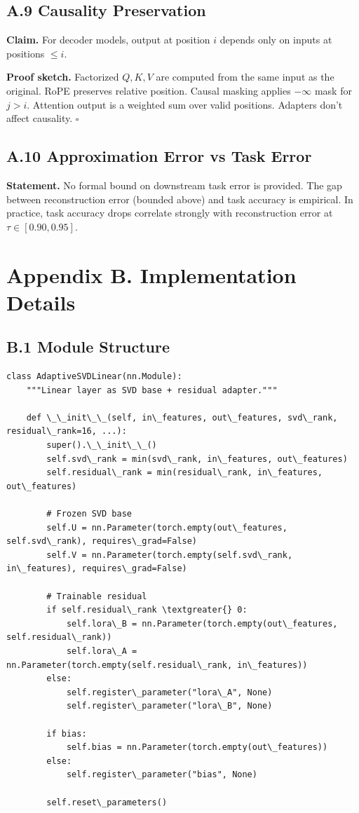 \subsection{A.9 Causality Preservation}

\textbf{Claim.} For decoder models, output at position $i$ depends only on inputs 
at positions $\leq i$.

\textbf{Proof sketch.} Factorized $Q, K, V$ are computed from the same input as 
the original. RoPE preserves relative position. Causal masking applies 
$-\infty$ mask for $j > i$. Attention output is a weighted sum over valid 
positions. Adapters don't affect causality. $\square$

\subsection{A.10 Approximation Error vs Task Error}

\textbf{Statement.} No formal bound on downstream task error is provided. The gap 
between reconstruction error (bounded above) and task accuracy is 
empirical. In practice, task accuracy drops correlate strongly with 
reconstruction error at $\tau \in [0.90, 0.95]$.


\section{Appendix B. Implementation Details}

\subsection{B.1 Module Structure}

\begin{lstlisting}
class AdaptiveSVDLinear(nn.Module):
    """Linear layer as SVD base + residual adapter."""
    
    def \_\_init\_\_(self, in\_features, out\_features, svd\_rank, residual\_rank=16, ...):
        super().\_\_init\_\_()
        self.svd\_rank = min(svd\_rank, in\_features, out\_features)
        self.residual\_rank = min(residual\_rank, in\_features, out\_features)
        
        # Frozen SVD base
        self.U = nn.Parameter(torch.empty(out\_features, self.svd\_rank), requires\_grad=False)
        self.V = nn.Parameter(torch.empty(self.svd\_rank, in\_features), requires\_grad=False)
        
        # Trainable residual
        if self.residual\_rank \textgreater{} 0:
            self.lora\_B = nn.Parameter(torch.empty(out\_features, self.residual\_rank))
            self.lora\_A = nn.Parameter(torch.empty(self.residual\_rank, in\_features))
        else:
            self.register\_parameter("lora\_A", None)
            self.register\_parameter("lora\_B", None)
        
        if bias:
            self.bias = nn.Parameter(torch.empty(out\_features))
        else:
            self.register\_parameter("bias", None)
        
        self.reset\_parameters()
\end{lstlisting}

